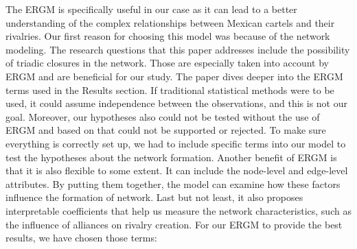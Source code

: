 \documentclass[
]{article}
\begin{document}
The ERGM is specifically useful in our case as it can lead to a better
understanding of the complex relationships between Mexican cartels and
their rivalries. Our first reason for choosing this model was because of
the network modeling. The research questions that this paper addresses
include the possibility of triadic closures in the network. Those are
especially taken into account by ERGM and are beneficial for our study.
The paper dives deeper into the ERGM terms used in the Results section.
If traditional statistical methods were to be used, it could assume
independence between the observations, and this is not our goal.
Moreover, our hypotheses also could not be tested without the use of
ERGM and based on that could not be supported or rejected. To make sure
everything is correctly set up, we had to include specific terms into
our model to test the hypotheses about the network formation. Another
benefit of ERGM is that it is also flexible to some extent. It can
include the node-level and edge-level attributes. By putting them
together, the model can examine how these factors influence the
formation of network. Last but not least, it also proposes interpretable
coefficients that help us measure the network characteristics, such as
the influence of alliances on rivalry creation. For our ERGM to provide
the best results, we have chosen those terms:
\end{document}
